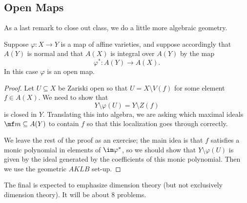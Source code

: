 \subsection{Open Maps}
As a last remark to close out class, we do a little more algebraic geometry. 
\begin{theorem}
	Suppose $\varphi\colon X\to Y$ is a map of affine varieties, and suppose accordingly that $A(Y)$ is normal and that $A(X)$ is integral over $A(Y)$ by the map
	\[\varphi^*\colon A(Y)\to A(X).\]
	In this case $\varphi$ is an open map.
\end{theorem}
\begin{proof}
	Let $U\subseteq X$ be Zariski open so that $U=X\setminus V(f)$ for some element $f\in A(X)$. We need to show that
	\[Y\setminus\varphi(U)=Y\setminus Z(f)\]
	is closed in $Y$. Translating this into algebra, we are asking which maximal ideals $\mf m\subseteq A(Y)$ to contain $f$ so that this localization goes through correctly.
	
	We leave the rest of the proof as an exercise; the main idea is that $f$ satisfies a monic polynomial in elements of $\im\varphi^*$, so we should show that $Y\setminus\varphi(U)$ is given by the ideal generated by the coefficients of this monic polynomial. Then we use the geometric $AKLB$ set-up.
\end{proof}
\begin{remark}
	The final is expected to emphasize dimension theory (but not exclusively dimension theory). It will be about 8 problems.
\end{remark}
